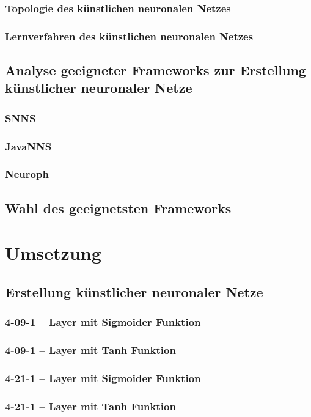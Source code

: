 \documentclass[11pt,a4paper]{scrreprt}
\begin{document}
		\subsection{Topologie des künstlichen neuronalen Netzes}
		\subsection{Lernverfahren des künstlichen neuronalen Netzes}
	\section{Analyse geeigneter Frameworks zur Erstellung künstlicher neuronaler Netze}
		\subsection{SNNS}
	  \subsection{JavaNNS} 
		\subsection{Neuroph}
	\section{Wahl des geeignetsten Frameworks}
	
\chapter{Umsetzung}
	\section{Erstellung künstlicher neuronaler Netze}
	 \subsection{4-09-1 – Layer mit Sigmoider Funktion}
	 \subsection{4-09-1 – Layer mit Tanh Funktion}
	 \subsection{4-21-1 – Layer mit Sigmoider Funktion}
	 \subsection{4-21-1 – Layer mit Tanh Funktion}
\end{document}
